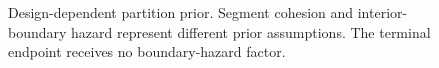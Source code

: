 \begin{figure}[!htbp]
  \centering
  \resizebox{0.96\columnwidth}{!}{}
  \caption{Design-dependent partition prior. Segment cohesion and interior-boundary hazard represent different prior assumptions. The terminal endpoint receives no boundary-hazard factor.}
  \label{fig:cohesion-hazard-paper}
\end{figure}
